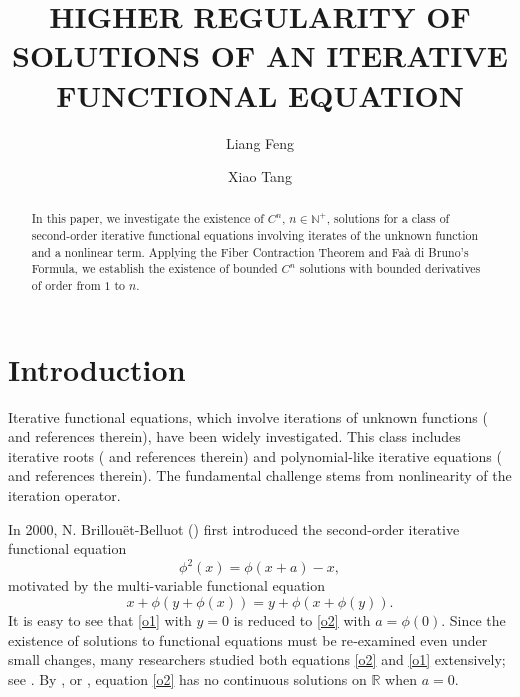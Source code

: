 \documentclass[11pt,reqno,a4paper]{amsart}
\numberwithin{equation}{section}
\begin{document}
	
	
\title{HIGHER REGULARITY OF SOLUTIONS OF AN
ITERATIVE FUNCTIONAL EQUATION}




\author{Liang Feng}
\address[Liang Feng]{School of Mathematical Sciences, Chongqing Normal University, Chongqing 401331, China}

\author{Xiao Tang}
\address[Xiao Tang]{School of Mathematical Sciences, Chongqing Normal University, Chongqing 401331, China}





\maketitle

 \begin{abstract}
In this paper, we investigate the existence of $C^n$, $n\in \mathbb{N}^+$, solutions  for a class of second-order iterative functional equations involving iterates of the unknown function and a nonlinear term. Applying the Fiber Contraction Theorem and Fa\`a di Bruno's Formula, we establish the existence of bounded $C^n$ solutions with bounded derivatives of order from $1$ to $n$.
\end{abstract}



\section{Introduction}
Iterative functional equations, which involve iterations of unknown functions (\cite{Baron2,KM} and references therein), have been widely investigated. 
This class includes iterative roots (\cite{LL1,LL2} and references therein) and polynomial-like iterative equations (\cite{MA,ZW} and references therein). The fundamental challenge stems from  nonlinearity of the iteration operator.


In 2000, N. Brillou\"{e}t-Belluot (\cite{BB1}) first introduced the second-order iterative functional equation
\begin{equation}\label{o2}
    \phi^2(x) = \phi(x+a)-x,
\end{equation}
motivated by the multi-variable functional equation
\begin{equation}\label{o1}
 x+\phi(y+\phi(x)) = y+\phi(x+\phi(y)).
\end{equation}
It is easy to see that \eqref{o1} with $y = 0$ is reduced to \eqref{o2} with $a=\phi(0)$. 
Since the existence of solutions to functional equations must be re‑examined even under small changes, many researchers  studied both equations \eqref{o2} and \eqref{o1} extensively; see \cite{Balcerowski, BB2, JJ, SM, TX, ZY}. By \cite[Corollary 3.8]{DS},  \cite[Theorem 11]{MJ} or \cite[Theorem 5]{YD}, equation \eqref{o2} has no continuous solutions on $\mathbb{R}$ when $a = 0$.
 
\end{document}
